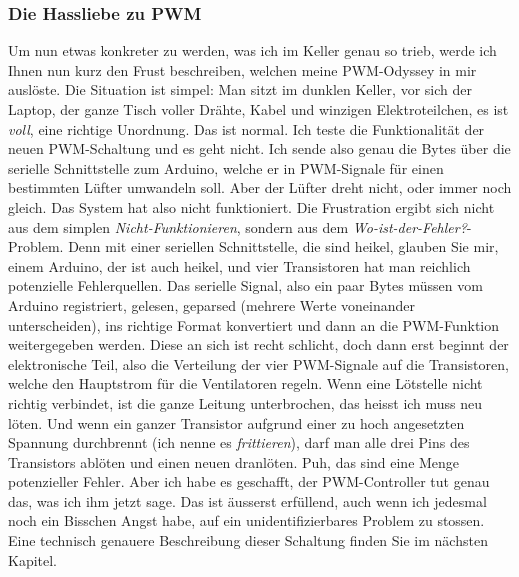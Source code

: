 \documentclass[12pt,titlepage,a4paper]{article}
\begin{document}
\subsubsection{Die Hassliebe zu PWM}
Um nun etwas konkreter zu werden, was ich im Keller genau so trieb, werde ich Ihnen nun kurz den Frust beschreiben, welchen meine PWM-Odyssey in mir auslöste. Die Situation ist simpel: Man sitzt im dunklen Keller, vor sich der Laptop, der ganze Tisch voller Drähte, Kabel und winzigen Elektroteilchen, es ist \textit{voll}, eine richtige Unordnung. Das ist normal. Ich teste die Funktionalität der neuen PWM-Schaltung und es geht nicht. Ich sende also genau die Bytes über die serielle Schnittstelle zum Arduino, welche er in PWM-Signale für einen bestimmten Lüfter umwandeln soll. Aber der Lüfter dreht nicht, oder immer noch gleich. Das System hat also nicht funktioniert. Die Frustration ergibt sich nicht aus dem simplen \textit{Nicht-Funktionieren}, sondern aus dem \textit{Wo-ist-der-Fehler?}-Problem. Denn mit einer seriellen Schnittstelle, die sind heikel, glauben Sie mir, einem Arduino, der ist auch heikel, und vier Transistoren hat man reichlich potenzielle Fehlerquellen. Das serielle Signal, also ein paar Bytes müssen vom Arduino registriert, gelesen, geparsed (mehrere Werte voneinander unterscheiden), ins richtige Format konvertiert und dann an die PWM-Funktion weitergegeben werden. Diese an sich ist recht schlicht, doch dann erst beginnt der elektronische Teil, also die Verteilung der vier PWM-Signale auf die Transistoren, welche den Hauptstrom für die Ventilatoren regeln. Wenn eine Lötstelle nicht richtig verbindet, ist die ganze Leitung unterbrochen, das heisst ich muss neu löten. Und wenn ein ganzer Transistor aufgrund einer zu hoch angesetzten Spannung durchbrennt (ich nenne es \textit{frittieren}), darf man alle drei Pins des Transistors ablöten und einen neuen dranlöten. Puh, das sind eine Menge potenzieller Fehler. Aber ich habe es geschafft, der PWM-Controller tut genau das, was ich ihm jetzt sage. Das ist äusserst erfüllend, auch wenn ich jedesmal noch ein Bisschen Angst habe, auf ein unidentifizierbares Problem zu stossen. Eine technisch genauere Beschreibung dieser Schaltung finden Sie im nächsten Kapitel.
\end{document}
